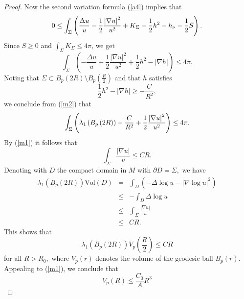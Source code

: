 \documentclass{amsart}
\numberwithin{equation}{section}
\begin{document}
\begin{proof}
Now the second variation formula (\ref{a4}) implies that
\begin{equation*}
0\leq \int_{\Sigma }\left( \frac{\Delta u}{u}-\frac{1}{2}\frac{\left\vert
\nabla u\right\vert ^{2}}{u^{2}}+K_{\Sigma }-\frac{1}{2}h^{2}-h_{\nu }-\frac{%
1}{2}S\right) .
\end{equation*}%
Since $S\geq 0$ and $\int_{\Sigma }K_{\Sigma }\leq 4\pi $, we get 
\begin{equation}
\int_{\Sigma }\left( -\frac{\Delta u}{u}+\frac{1}{2}\frac{\left\vert \nabla
u\right\vert ^{2}}{u^{2}}+\frac{1}{2}h^{2}-\left\vert \nabla h\right\vert
\right) \leq 4\pi .  \label{m2}
\end{equation}%
Noting that $\Sigma \subset B_{p}\left( 2R\right)\setminus B_{p}\left( \frac{R}{2}\right) $ and that
$h$ satisfies
\begin{equation*}
\frac{1}{2}h^{2}-\left\vert \nabla h\right\vert \geq -\frac{C}{R^{2}},
\end{equation*}%
we conclude from (\ref{m2}) that 
\begin{equation*}
\int_{\Sigma }\left( \lambda _{1}\left( B_{p}\left( 2R\right) \right) -\frac{%
C}{R^{2}}+\frac{1}{2}\frac{\left\vert \nabla u\right\vert ^{2}}{u^{2}}%
\right) \leq 4\pi .
\end{equation*}%
By (\ref{m1}) it follows that 
\begin{equation}
\int_{\Sigma }\frac{\left\vert \nabla u\right\vert }{u}\leq CR.  \label{m3}
\end{equation}%
Denoting with $D$ the compact domain in $M$ with $\partial D=\Sigma,$ we have
\begin{eqnarray*}
\lambda _{1}\left( B_{p}\left( 2R\right) \right) \mathrm{Vol}\left( D\right) 
&=&\int_{D}\left( -\Delta \log u-\left\vert \nabla \log u\right\vert
^{2}\right)  \\
&\leq &-\int_{D}\Delta \log u \\
&\leq &\int_{\Sigma }\frac{\left\vert \nabla u\right\vert }{u} \\
&\leq &CR.
\end{eqnarray*}%
This shows that 
\begin{equation}
\lambda _{1}\left( B_{p}\left( 2R\right) \right) V_{p}\left( \frac{R}{2}%
\right) \leq CR  \label{m4}
\end{equation}%
for all $R>R_{0},$ where $V_p(r)$ denotes the volume of the geodesic ball $B_p(r).$
Appealing to (\ref{m1}), we conclude that 
\begin{equation}
V_{p}\left( R\right) \leq \frac{C_{0}}{A}R^{3}  \label{m5}

\end{equation}
\end{proof}
\end{document}
